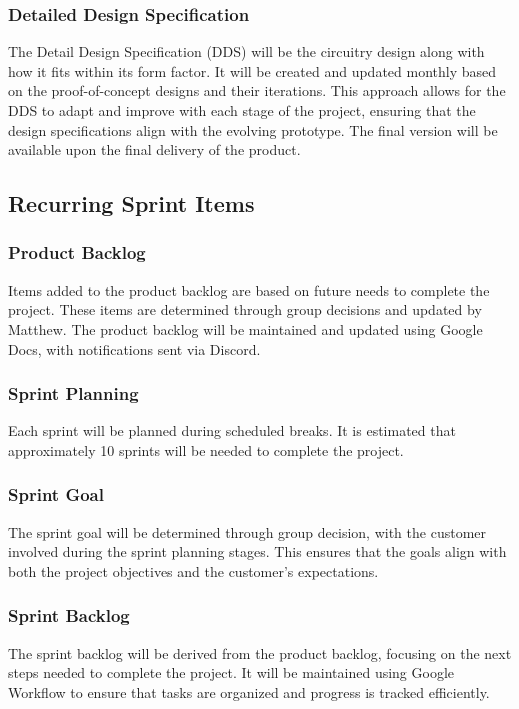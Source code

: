 \subsubsection{Detailed Design Specification}
The Detail Design Specification (DDS) will be the circuitry design along with how it fits within its form factor. It will be created and updated monthly based on the proof-of-concept designs and their iterations. This approach allows for the DDS to adapt and improve with each stage of the project, ensuring that the design specifications align with the evolving prototype. The final version will be available upon the final delivery of the product.

\subsection{Recurring Sprint Items}


\subsubsection{Product Backlog}
Items added to the product backlog are based on future needs to complete the project. These items are determined through group decisions and updated by Matthew. The product backlog will be maintained and updated using Google Docs, with notifications sent via Discord. 

\subsubsection{Sprint Planning}
Each sprint will be planned during scheduled breaks. It is estimated that approximately 10 sprints will be needed to complete the project.

\subsubsection{Sprint Goal}
The sprint goal will be determined through group decision, with the customer involved during the sprint planning stages. This ensures that the goals align with both the project objectives and the customer's expectations. 

\subsubsection{Sprint Backlog}
The sprint backlog will be derived from the product backlog, focusing on the next steps needed to complete the project. It will be maintained using Google Workflow to ensure that tasks are organized and progress is tracked efficiently.



